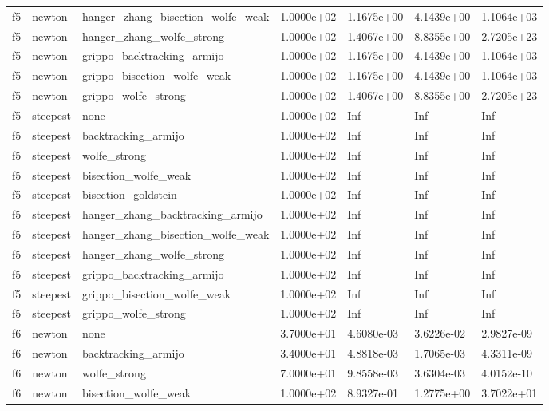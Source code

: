 \documentclass[a4paper,11pt]{article}
\numberwithin{equation}{section} %
\begin{document}
\begin{longtable}{p{1.5cm}|p{1.5cm}|p{4cm}|p{2cm}|p{2cm}|p{2cm}|p{2cm}}
        f5 & newton & hanger\_zhang\_bisection\_wolfe\_weak & 1.0000e+02 & 1.1675e+00 & 4.1439e+00 & 1.1064e+03 \\
        f5 & newton & hanger\_zhang\_wolfe\_strong & 1.0000e+02 & 1.4067e+00 & 8.8355e+00 & 2.7205e+23 \\
        f5 & newton & grippo\_backtracking\_armijo & 1.0000e+02 & 1.1675e+00 & 4.1439e+00 & 1.1064e+03 \\
        f5 & newton & grippo\_bisection\_wolfe\_weak & 1.0000e+02 & 1.1675e+00 & 4.1439e+00 & 1.1064e+03 \\
        f5 & newton & grippo\_wolfe\_strong & 1.0000e+02 & 1.4067e+00 & 8.8355e+00 & 2.7205e+23 \\
        f5 & steepest & none & 1.0000e+02 & Inf & Inf & Inf \\
        f5 & steepest & backtracking\_armijo & 1.0000e+02 & Inf & Inf & Inf \\
        f5 & steepest & wolfe\_strong & 1.0000e+02 & Inf & Inf & Inf \\
        f5 & steepest & bisection\_wolfe\_weak & 1.0000e+02 & Inf & Inf & Inf \\
        f5 & steepest & bisection\_goldstein & 1.0000e+02 & Inf & Inf & Inf \\
        f5 & steepest & hanger\_zhang\_backtracking\_armijo & 1.0000e+02 & Inf & Inf & Inf \\
        f5 & steepest & hanger\_zhang\_bisection\_wolfe\_weak & 1.0000e+02 & Inf & Inf & Inf \\
        f5 & steepest & hanger\_zhang\_wolfe\_strong & 1.0000e+02 & Inf & Inf & Inf \\
        f5 & steepest & grippo\_backtracking\_armijo & 1.0000e+02 & Inf & Inf & Inf \\
        f5 & steepest & grippo\_bisection\_wolfe\_weak & 1.0000e+02 & Inf & Inf & Inf \\
        f5 & steepest & grippo\_wolfe\_strong & 1.0000e+02 & Inf & Inf & Inf \\
        f6 & newton & none & 3.7000e+01 & 4.6080e-03 & 3.6226e-02 & 2.9827e-09 \\
        f6 & newton & backtracking\_armijo & 3.4000e+01 & 4.8818e-03 & 1.7065e-03 & 4.3311e-09 \\
        f6 & newton & wolfe\_strong & 7.0000e+01 & 9.8558e-03 & 3.6304e-03 & 4.0152e-10 \\
        f6 & newton & bisection\_wolfe\_weak & 1.0000e+02 & 8.9327e-01 & 1.2775e+00 & 3.7022e+01 \\

\end{longtable}
\end{document}

